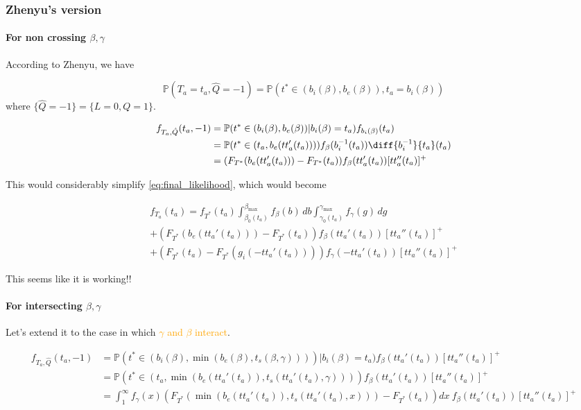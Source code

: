 \documentclass{article}
\begin{document}
\subsubsection{Zhenyu's version}

\paragraph{For non crossing $\beta, \gamma$}

According to Zhenyu, we have

\begin{equation*}
  \mathbb{P}(T_a = t_a, \hat{Q} = -1) = \mathbb{P}(t^* \in (b_i(\beta), b_e(\beta)), t_a = b_i(\beta))
\end{equation*}
where \(\{\hat{Q} = -1\} = \{L = 0, Q = 1\}\).

\begin{align*}
  f_{T_a, \hat{Q}}(t_a, -1) & = \mathbb{P}(t^* \in (b_i(\beta), b_e(\beta)) | b_i(\beta) = t_a)f_{b_i(\beta)}(t_a) \\
  & = \mathbb{P}(t^* \in (t_a, b_e(tt_a'(t_a)))) f_\beta(b_i^{-1}(t_a)) \diff{b_i^{-1}}{t_a}(t_a) \\
  & = (F_{T^*}(b_e(tt_a'(t_a))) - F_{T^*}(t_a))f_\beta(tt_a'(t_a))[tt_a''(t_a)]^+
\end{align*}

This would considerably simplify \eqref{eq:final_likelihood}, which would become

\begin{multline}
  \label{eq:final_zhenyu}
  f_{T_a}(t_a) = f_{T^*}(t_a)\int_{\beta_0(t_a)}^{\beta_\text{max}}f_\beta(b)\, db\int_{\gamma_0(t_a)}^{\gamma_\text{max}}f_\gamma(g)\, dg \\
  + (F_{T^*}(b_e(tt_a'(t_a))) - F_{T^*}(t_a))f_\beta(tt_a'(t_a))[tt_a''(t_a)]^+ \\
  + (F_{T^*}(t_a) - F_{T^*}(g_i(-tt_a'(t_a)))) f_\gamma(-tt_a'(t_a))[tt_a''(t_a)]^+
\end{multline}

This seems like it is working!!

\paragraph{For intersecting $\beta, \gamma$}

Let's extend it to the case in which \textcolor{orange}{\(\gamma\) and \(\beta\) interact}.

\begin{align*}
    f_{T_a, \hat{Q}}(t_a, -1) & = \mathbb{P}(t^* \in (b_i(\beta), \min(b_e(\beta), t_s(\beta, \gamma)))) | b_i(\beta) = t_a)f_\beta(tt_a'(t_a))[tt_a''(t_a)]^+ \\
  & = \mathbb{P}(t^* \in (t_a, \min(b_e(tt_a'(t_a)), t_s(tt_a'(t_a), \gamma))))f_\beta(tt_a'(t_a))[tt_a''(t_a)]^+ \\
  & = \int_1^\infty f_\gamma(x) (F_{T^*}(\min(b_e(tt_a'(t_a)), t_s(tt_a'(t_a), x))) - F_{T^*}(t_a)) dx\ f_\beta(tt_a'(t_a))[tt_a''(t_a)]^+
\end{align*}
\end{document}
